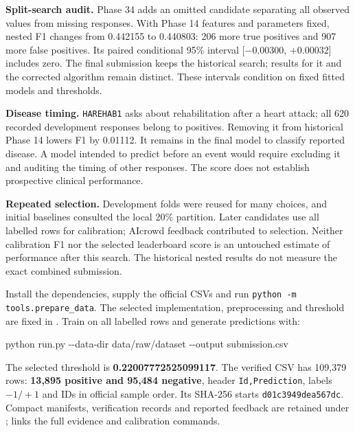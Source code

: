 \documentclass[10pt,a4paper]{article}
\newcommand{\heading}[1]{\vspace{5pt}{\large\bfseries #1}\par\vspace{2pt}}
\newcommand{\code}[1]{\texttt{\small #1}}
\begin{document}
\heading{Interpretation and limitations}
\textbf{Split-search audit.} Phase 34 adds an omitted candidate separating
all observed values from missing responses. With Phase 14 features and
parameters fixed, nested F1 changes from 0.442155 to 0.440803: 206 more
true positives and 907 more false positives. Its paired conditional 95\%
interval [$-0.00300$, $+0.00032$] includes zero. The final submission keeps
the historical search; results for it and the corrected algorithm remain
distinct. These intervals condition on fixed fitted models and thresholds.

\textbf{Disease timing.} \code{HAREHAB1} asks about rehabilitation after a
heart attack; all 620 recorded development responses belong to positives.
Removing it from historical Phase 14 lowers F1 by 0.01112. It remains in
the final model to classify reported disease. A model intended to predict
before an event would require excluding it and auditing the timing of other
responses. The score does not establish prospective clinical performance.

\textbf{Repeated selection.} Development folds were reused for many choices,
and initial baselines consulted the local 20\% partition. Later candidates
use all labelled rows for calibration; AIcrowd feedback contributed to
selection. Neither calibration F1 nor the selected leaderboard score is an
untouched estimate of performance after this search. The historical nested
results do not measure the exact combined submission.

\heading{Reproduction and final output}
Install the dependencies, supply the official CSVs and run
\code{python -m tools.prepare\_data}. The selected implementation,
preprocessing and threshold are fixed in .
Train on all labelled rows and generate predictions with:\par
{\small\ttfamily python run.py -{}-data-dir data/raw/dataset -{}-output submission.csv}\par
The selected threshold is \textbf{0.22007772525099117}. The verified CSV has
109,379 rows: \textbf{13,895 positive and 95,484 negative}, header
\code{Id,Prediction}, labels $-1/+1$ and IDs in official sample order.
Its SHA-256 starts \code{d01c3949dea567dc}. Compact manifests, verification
records and reported feedback are retained under ;
 links the full evidence and calibration commands.
\end{document}
